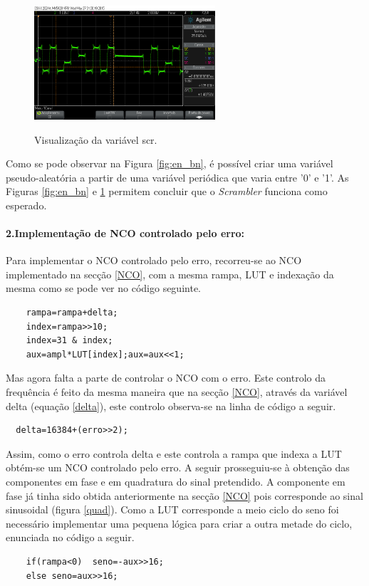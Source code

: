 \documentclass[11pt]{article}
\numberwithin{equation}{section}
\begin{document}
\begin{figure}[H]
	\centering
	\includegraphics[width=0.6\textwidth]{./scr}~\\
	\caption{Visualização da variável scr.}
	\label{fig:scr}
\end{figure}

Como se pode observar na Figura \ref{fig:en_bn}, é possível criar uma variável pseudo-aleatória a partir de uma variável periódica que varia entre '0' e '1'. As Figuras \ref{fig:en_bn} e \ref{fig:scr} permitem concluir que o \textit{Scrambler} funciona como esperado.

\paragraph{2.Implementação de NCO controlado pelo erro:} \hspace{0pt} \label{para:P3-2}

Para implementar o NCO controlado pelo erro, recorreu-se ao NCO implementado na secção \ref{NCO}, com a mesma rampa, LUT e indexação da mesma como se pode ver no código seguinte.
\begin{lstlisting}
	rampa=rampa+delta;
	index=rampa>>10;
	index=31 & index;
	aux=ampl*LUT[index];aux=aux<<1;
\end{lstlisting}

Mas agora falta a parte de controlar o NCO com o erro. Este controlo da frequência é feito da mesma maneira que na secção \ref{NCO}, através da variável delta (equação \ref{delta}), este controlo observa-se na linha de código a seguir.
\begin{lstlisting}
  delta=16384+(erro>>2);
\end{lstlisting}

Assim, como o erro controla delta e este controla a rampa que indexa a LUT obtém-se um NCO controlado pelo erro.
A seguir prosseguiu-se à obtenção das componentes em fase e em quadratura do sinal pretendido. A componente em fase já tinha sido obtida anteriormente na secção \ref{NCO} pois corresponde ao sinal sinusoidal (figura \ref{quad}). Como a LUT corresponde a meio ciclo do seno foi necessário implementar uma pequena lógica para criar a outra metade do ciclo, enunciada no código a seguir.
\begin{lstlisting}
	if(rampa<0)  seno=-aux>>16;
	else seno=aux>>16;
\end{lstlisting}
\end{document}
